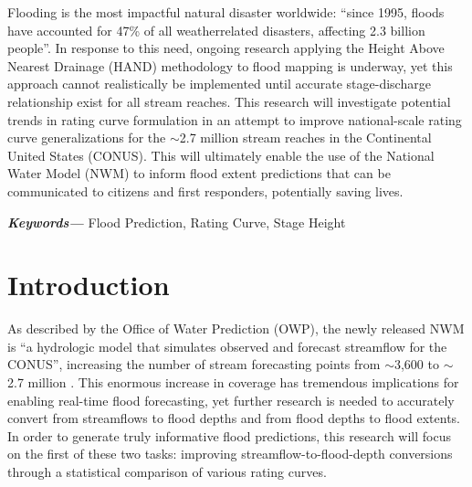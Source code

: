 \documentclass[12pt]{article}
\title{\vspace*{-0.0in}{\bfseries\large A Comparison of Rating Curve Generation Methodologies}\vspace{-11pt}}
\author{{\textit{\normalsize Paul Ruess}}}
\date{\vspace{-30pt}}
\renewenvironment{abstract}
 {\small
  \begin{center}
  \bfseries \abstractname\vspace{-.5em}\vspace{0pt}
  \end{center}
  \list{}{%
    \setlength{\leftmargin}{0mm}%
    \setlength{\rightmargin}{\leftmargin}%
  }%
  \item\relax}
 {\endlist}
\providecommand{\keywords}[1]{\textbf{\textit{Keywords---}} #1}
\begin{document}
\maketitle

\begin{abstract} %
Flooding is the most impactful natural disaster worldwide: ``since 1995, floods have accounted for 47\% of all weatherrelated disasters, affecting 2.3 billion people''.\cite{disaster2015} In response to this need, ongoing research applying the Height Above Nearest Drainage (HAND) methodology to flood mapping is underway, yet this approach cannot realistically be implemented until accurate stage-discharge relationship exist for all stream reaches.\cite{nfiehand} This research will investigate potential trends in rating curve formulation in an attempt to improve national-scale rating curve generalizations for the $\sim$2.7 million stream reaches in the Continental United States (CONUS). This will ultimately enable the use of the National Water Model (NWM) to inform flood extent predictions that can be communicated to citizens and first responders, potentially saving lives.

\end{abstract}

\keywords{Flood Prediction, Rating Curve, Stage Height} %

\section*{Introduction} %
As described by the Office of Water Prediction (OWP), the newly released NWM is ``a hydrologic model that simulates observed and forecast streamflow for the CONUS'', increasing the number of stream forecasting points from $\sim$3,600 to $\sim$2.7 million \cite{nwmsummary}.\autocite{nwmsummary} This enormous increase in coverage has tremendous implications for enabling real-time flood forecasting, yet further research is needed to accurately convert from streamflows to flood depths and from flood depths to flood extents. In order to generate truly informative flood predictions, this research will focus on the first of these two tasks: improving streamflow-to-flood-depth conversions through a statistical comparison of various rating curves. 
\end{document}

